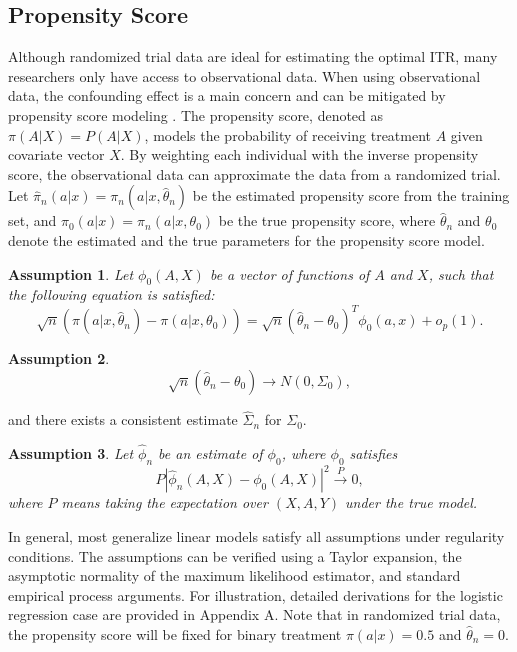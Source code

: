 \documentclass{article}
\newtheorem{assumption}{Assumption}
\begin{document}
\subsection{Propensity Score}
Although randomized trial data are ideal for estimating the optimal ITR, many researchers only have access to observational data. 
When using observational data, the confounding effect is a main concern and can be mitigated by propensity score modeling \citep{austin2011introduction}. The propensity score, denoted as $\pi(A|X) = P(A|X)$, models the probability of receiving treatment $A$ given covariate vector $X$. By weighting each individual with the inverse propensity score, the observational data can approximate the data from a randomized trial. Let $\hat{\pi}_n(a|x) = \pi_n(a|x,\hat{\theta}_n)$ be the estimated propensity score from the training set, and $\pi_0(a|x) = \pi_n(a|x,\theta_0)$ be the true propensity score, where $\hat{\theta}_n$ and $\theta_0$ denote the estimated and the true parameters for the propensity score model. 

\begin{assumption} \label{proposition_propen}
Let $\phi_0(A,X)$ be a vector of functions of $A$ and $X$, such that the following equation is satisfied:
\begin{equation}
    \sqrt{n}(\pi(a|x,\hat{\theta}_n)-\pi(a|x,\theta_0))=\sqrt{n}(\hat{\theta}_n-\theta_0)^T\phi_0(a,x)+o_p(1).
\end{equation}
 \end{assumption}

\begin{assumption}

\begin{equation}
    \sqrt{n}(\hat{\theta}_n-\theta_0) \rightarrow N(0,\Sigma_0),
\end{equation}

\end{assumption}

and there exists a consistent estimate $\hat{\Sigma}_n$ for $\Sigma_0$.


\begin{assumption}
Let $\hat{\phi}_n$ be an estimate of $\phi_0$, where $\phi_0$ satisfies  
\begin{equation}
P |\hat{\phi}_n(A,X)-\phi_0(A,X)|^2\xrightarrow{P}0,\end{equation} 
where $P$ means taking the expectation over $(X,A,Y)$ under the true model.
\end{assumption}

In general, most generalize linear models satisfy all assumptions under regularity conditions. The assumptions can be verified using a Taylor expansion, the asymptotic normality of the maximum likelihood estimator, and standard empirical process arguments. For illustration, detailed derivations for the logistic regression case are provided in Appendix A. Note that in randomized trial data, the propensity score will be fixed for binary treatment $\pi(a|x)=0.5$ and $\hat{\theta}_n=0$.
\end{document}
